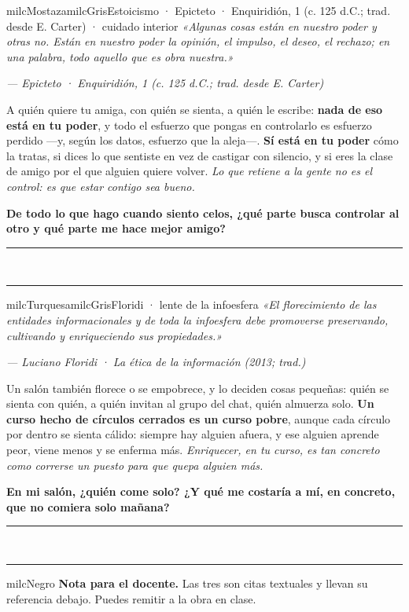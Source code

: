 \documentclass[11pt,letterpaper]{article}
\newcommand{\linead}[1]{\noindent\color{milcLinea}\rule{#1}{0.5pt}\color{milcNegro}}
\begin{document}
\begin{softbox}{milcMostaza}{milcGris}{Estoicismo · Epicteto · Enquiridión, 1 (c. 125 d.C.; trad. desde E. Carter) · cuidado interior}
\textit{«Algunas cosas están en nuestro poder y otras no. Están en nuestro poder la opinión, el impulso, el deseo, el rechazo; en una palabra, todo aquello que es obra nuestra.»}

{\footnotesize\itshape\color{milcNegro!70}--- Epicteto · Enquiridión, 1 (c. 125 d.C.; trad. desde E. Carter)}

A quién quiere tu amiga, con quién se sienta, a quién le escribe: \textbf{nada de eso está en tu poder}, y todo el esfuerzo que pongas en controlarlo es esfuerzo perdido ---y, según los datos, esfuerzo que la aleja---. \textbf{Sí está en tu poder} cómo la tratas, si dices lo que sentiste en vez de castigar con silencio, y si eres la clase de amigo por el que alguien quiere volver. \emph{Lo que retiene a la gente no es el control: es que estar contigo sea bueno.}

\textbf{De todo lo que hago cuando siento celos, ¿qué parte busca controlar al otro y qué parte me hace mejor amigo?}
\end{softbox}
\linead{\linewidth}\\[1mm]
\linead{\linewidth}

\begin{softbox}{milcTurquesa}{milcGris}{Floridi · lente de la infoesfera}
\textit{«El florecimiento de las entidades informacionales y de toda la infoesfera debe promoverse preservando, cultivando y enriqueciendo sus propiedades.»}

{\footnotesize\itshape\color{milcNegro!70}--- Luciano Floridi · La ética de la información (2013; trad.)}

Un salón también florece o se empobrece, y lo deciden cosas pequeñas: quién se sienta con quién, a quién invitan al grupo del chat, quién almuerza solo. \textbf{Un curso hecho de círculos cerrados es un curso pobre}, aunque cada círculo por dentro se sienta cálido: siempre hay alguien afuera, y ese alguien aprende peor, viene menos y se enferma más. \emph{Enriquecer, en tu curso, es tan concreto como correrse un puesto para que quepa alguien más.}

\textbf{En mi salón, ¿quién come solo? ¿Y qué me costaría a mí, en concreto, que no comiera solo mañana?}
\end{softbox}
\linead{\linewidth}\\[1mm]
\linead{\linewidth}

\begin{infoband}{milcNegro}
\textbf{Nota para el docente.} Las tres son citas textuales y llevan su referencia debajo. Puedes remitir a la obra en clase.
\end{infoband}
\end{document}
